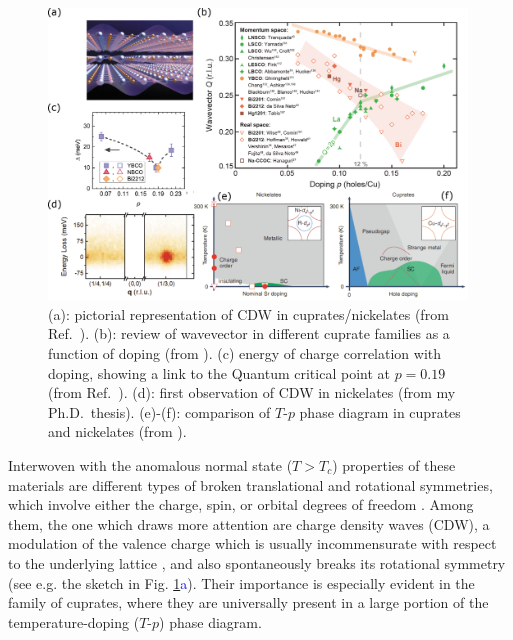 \documentclass[a4paper, 12pt]{article}
\begin{document}
%
\begin{figure}[t]
    \centering
    \includegraphics[width=0.99\textwidth]{cdw_tot2.eps}
    \caption{(a): pictorial representation of CDW in cuprates/nickelates (from Ref.~\cite{wahlberg2021restored}). (b): review of wavevector in different cuprate families as a function of doping (from \cite{comin2016resonant}). (c) energy of charge correlation with doping, showing a link to the Quantum critical point at $p=0.19$ (from Ref.~\cite{arpaia2022signature}). (d): first observation of CDW in nickelates (from my Ph.D.~thesis). (e)-(f): comparison of $T$-$p$ phase diagram in cuprates and nickelates (from \cite{benckiser2022neighbours}).}
    \label{fig:cdw}
\end{figure}
%
Interwoven with the anomalous normal state ($T>T_c$) properties of these materials are different types of broken translational and rotational symmetries, which involve either the charge, spin, or orbital degrees of freedom \cite{keimer2015quantum}.
Among them, the one which draws more attention are charge density waves (CDW), a modulation of the valence charge which is usually incommensurate with respect to the underlying lattice \cite{comin2016resonant}, and also spontaneously breaks its rotational symmetry (see e.g. the sketch in Fig. \ref{fig:cdw}\textcolor{blue}{a}). Their importance is especially evident in the family of cuprates, where they are universally present \cite{comin2016resonant} in a large portion of the temperature-doping ($T$-$p$) phase diagram.
\end{document}
